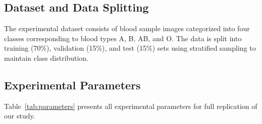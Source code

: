 \documentclass[runningheads]{llncs}
\begin{document}
\subsection{Dataset and Data Splitting}

The experimental dataset consists of blood sample images categorized into four classes corresponding to blood types A, B, AB, and O. The data is split into training (70\%), validation (15\%), and test (15\%) sets using stratified sampling to maintain class distribution.

\subsection{Experimental Parameters}

Table~\ref{tab:parameters} presents all experimental parameters for full replication of our study.
\end{document}
